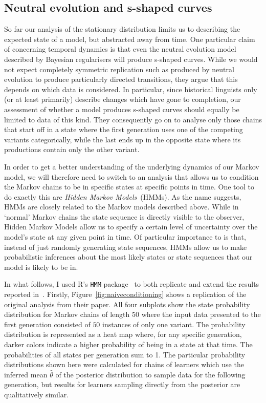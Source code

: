 \subsection{Neutral evolution and s-shaped curves}

So far our analysis of the stationary distribution limits us to describing the expected state of a model, but abstracted away from time.
One particular claim of \citet{Reali2010} concerning temporal dynamics is that even the neutral evolution model described by Bayesian regularisers will produce s-shaped curves. While we would not expect completely symmetric replication such as produced by neutral evolution to produce particularly directed transitions, they argue that this depends on which data is considered. In particular, since historical linguists only (or at least primarily) describe changes which have gone to completion, our assessment of whether a model produces s-shaped curves should equally be limited to data of this kind. They consequently go on to analyse only those chains that start off in a state where the first generation uses one of the competing variants categorically, while the last ends up in the opposite state where its productions contain only the other variant.

In order to get a better understanding of the underlying dynamics of our Markov model, we will therefore need to switch to an analysis that allows us to condition the Markov chains to be in specific states at specific points in time. One tool to do exactly this are \emph{Hidden Markov Models}~(HMMs). As the name suggests, HMMs are closely related to the Markov models described above. While in `normal' Markov chains the state sequence is directly visible to the observer, Hidden Markov Models allow us to specify a certain level of uncertainty over the model's state at any given point in time. Of particular importance to is that, instead of just randomly generating state sequences, HMMs allow us to make probabilistic inferences about the most likely states or state sequences that our model is likely to be in.

In what follows, I used R's \texttt{HMM} package~\citep{HMM1.0} to both replicate and extend the results reported in~\citet{Reali2010}. Firstly, Figure~\ref{fig:naiveconditioning} shows a replication of the original analysis from their paper. All four subplots show the state probability distribution for Markov chains of length $50$ where the input data presented to the first generation consisted of $50$ instances of only one variant. The probability distribution is represented as a heat map where, for any specific generation, darker colors indicate a higher probability of being in a state at that time. The probabilities of all states per generation sum to 1. The particular probability distributions shown here were calculated for chains of learners which use the inferred mean $\hat{\theta}$ of the posterior distribution to sample data for the following generation, but results for learners sampling directly from the posterior are qualitatively similar.

